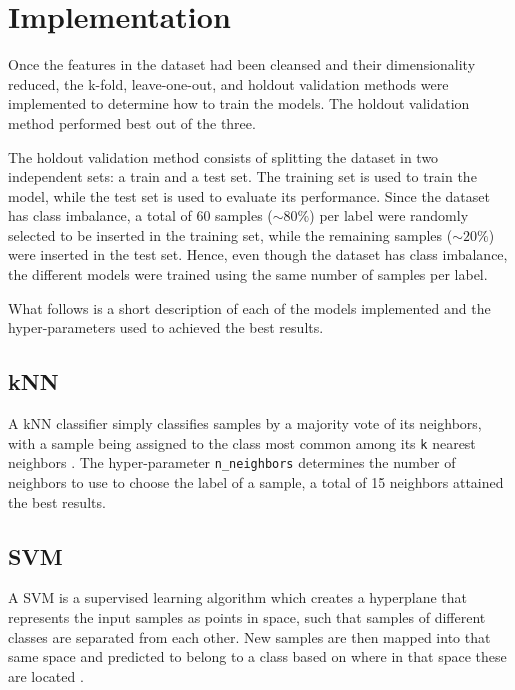 \section{Implementation} \label{impl}

Once the features in the dataset had been cleansed and their dimensionality reduced, the k-fold, leave-one-out, and holdout validation methods were implemented to determine how to train the models. The holdout validation method performed best out of the three.

The holdout validation method consists of splitting the dataset in two independent sets: a train and a test set. The training set is used to train the model, while the test set is used to evaluate its performance. Since the dataset has class imbalance, a total of 60 samples ($\sim$$80\%$) per label  were randomly selected to be inserted in the training set, while the remaining samples ($\sim$$20\%$) were inserted in the test set. Hence, even though the dataset has class imbalance, the different models were trained using the same number of samples per label.

What follows is a short description of each of the models implemented and the hyper-parameters used to achieved the best results.

\subsection{kNN}

A kNN classifier simply classifies samples by a majority vote of its neighbors, with a sample being assigned to the class most common among its \texttt{k} nearest neighbors \cite{data-mining-intro}. The hyper-parameter \texttt{n\_neighbors} determines the number of neighbors to use to choose the label of a sample, a total of 15 neighbors attained the best results.

\subsection{SVM}

A SVM is a supervised learning algorithm which creates a hyperplane that represents the input samples as points in space, such that samples of different classes are separated from each other. New samples are then mapped into that same space and predicted to belong to a class based on where in that space these are located \cite{data-mining-intro}.

